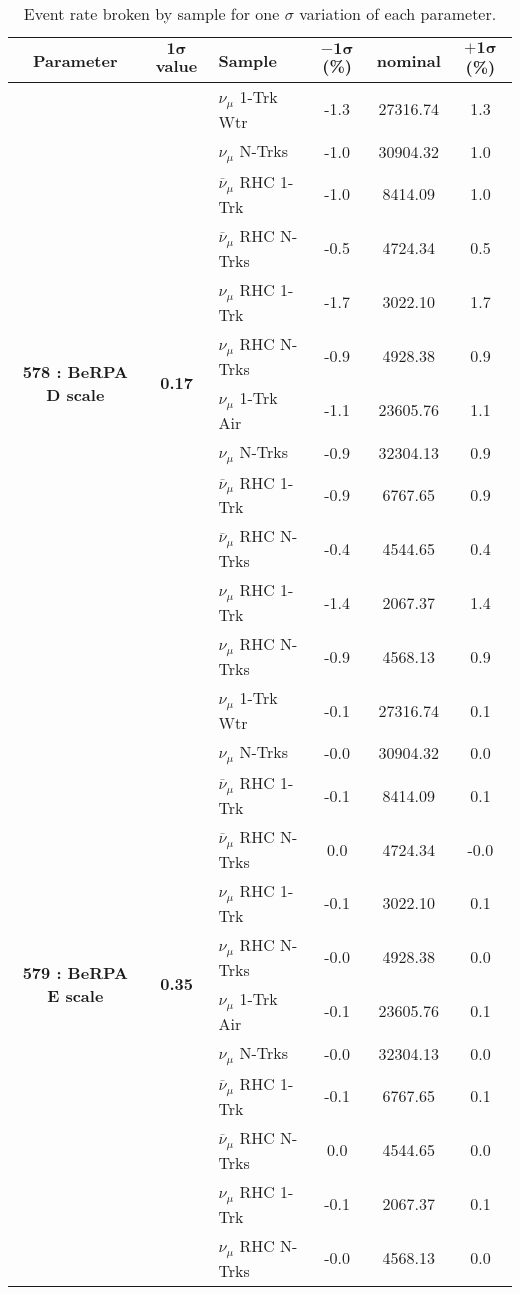 \addtocounter{table}{-1}
\begin{table}[ht!]
\centering
\begin{tabular}{ c  c  l  c  c  c }
\midrule[1.3pt]
\textbf{Parameter} & \textbf{$\mathbf{1\sigma}$ value} & \textbf{Sample} & \textbf{$\mathbf{-1\sigma}$ (\%)}  &  \textbf{nominal}  &  \textbf{$\mathbf{+1\sigma}$ (\%)} \\
\midrule[1.3pt]
\multirow{12}{*}{\textbf{578 : BeRPA D scale}} & \multirow{12}{*}{\textbf{0.17}} & $\nu_\mu$ 1-Trk Wtr &   -1.3 &  27316.74 &   1.3 \\ 
 &  & $\nu_\mu$ N-Trks &   -1.0 &  30904.32 &   1.0 \\ 
 &  & $\overline{\nu}_\mu$ RHC 1-Trk &   -1.0 &  8414.09 &   1.0 \\ 
 &  & $\overline{\nu}_\mu$ RHC N-Trks &   -0.5 &  4724.34 &   0.5 \\ 
 &  & $\nu_\mu$ RHC 1-Trk &   -1.7 &  3022.10 &   1.7 \\ 
 &  & $\nu_\mu$ RHC N-Trks &   -0.9 &  4928.38 &   0.9 \\ 
 &  & $\nu_\mu$ 1-Trk Air &   -1.1 &  23605.76 &   1.1 \\ 
 &  & $\nu_\mu$ N-Trks &   -0.9 &  32304.13 &   0.9 \\ 
 &  & $\overline{\nu}_\mu$ RHC 1-Trk &   -0.9 &  6767.65 &   0.9 \\ 
 &  & $\overline{\nu}_\mu$ RHC N-Trks &   -0.4 &  4544.65 &   0.4 \\ 
 &  & $\nu_\mu$ RHC 1-Trk &   -1.4 &  2067.37 &   1.4 \\ 
 &  & $\nu_\mu$ RHC N-Trks &   -0.9 &  4568.13 &   0.9 \\ 
\midrule[1.3pt]
\multirow{12}{*}{\textbf{579 : BeRPA E scale}} & \multirow{12}{*}{\textbf{0.35}} & $\nu_\mu$ 1-Trk Wtr &   -0.1 &  27316.74 &   0.1 \\ 
 &  & $\nu_\mu$ N-Trks &   -0.0 &  30904.32 &   0.0 \\ 
 &  & $\overline{\nu}_\mu$ RHC 1-Trk &   -0.1 &  8414.09 &   0.1 \\ 
 &  & $\overline{\nu}_\mu$ RHC N-Trks &   0.0 &  4724.34 &   -0.0 \\ 
 &  & $\nu_\mu$ RHC 1-Trk &   -0.1 &  3022.10 &   0.1 \\ 
 &  & $\nu_\mu$ RHC N-Trks &   -0.0 &  4928.38 &   0.0 \\ 
 &  & $\nu_\mu$ 1-Trk Air &   -0.1 &  23605.76 &   0.1 \\ 
 &  & $\nu_\mu$ N-Trks &   -0.0 &  32304.13 &   0.0 \\ 
 &  & $\overline{\nu}_\mu$ RHC 1-Trk &   -0.1 &  6767.65 &   0.1 \\ 
 &  & $\overline{\nu}_\mu$ RHC N-Trks &   0.0 &  4544.65 &   0.0 \\ 
 &  & $\nu_\mu$ RHC 1-Trk &   -0.1 &  2067.37 &   0.1 \\ 
 &  & $\nu_\mu$ RHC N-Trks &   -0.0 &  4568.13 &   0.0 \\ 
\midrule[1.3pt]
\end{tabular}
\centering
\caption{Event rate broken by sample for one $\sigma$ variation of each parameter.}
\end{table}
